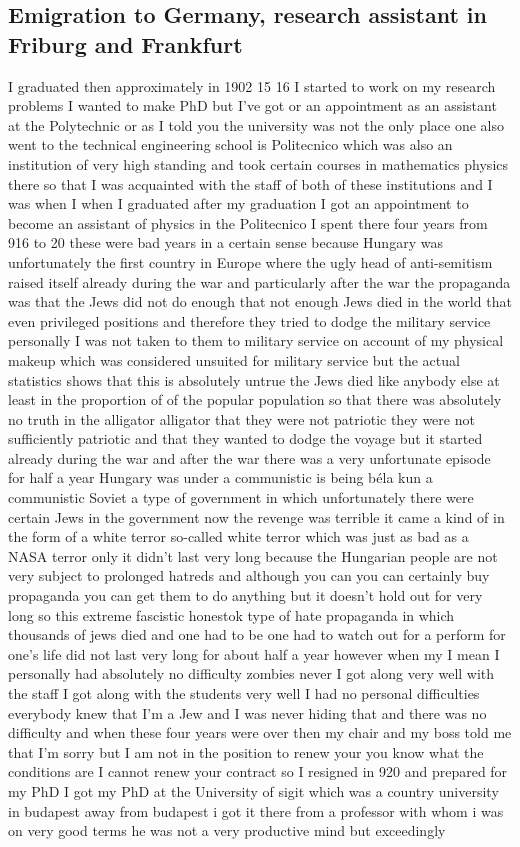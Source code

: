 \documentclass{article}
\begin{document}
\subsection{Emigration to Germany, research assistant in Friburg and Frankfurt}
I graduated then approximately in 1902 15 16 I started to work on my research problems I wanted to make PhD but I've got or an appointment as an assistant at the Polytechnic or as I told you the university was not the only place one also went to the technical engineering school is Politecnico which was also an institution of very high standing and took certain courses in mathematics physics there so that I was acquainted with the staff of both of these institutions and I was when I when I graduated after my graduation I got an appointment to become an assistant of physics in the Politecnico I spent there four years from 916 to 20 these were bad years in a certain sense because Hungary was unfortunately the first country in Europe where the ugly head of anti-semitism raised itself already during the war and particularly after the war the propaganda was that the Jews did not do enough that not enough Jews died in the world that even privileged positions and therefore they tried to dodge the military service personally I was not taken to them to military service on account of my physical makeup which was considered unsuited for military service but the actual statistics shows that this is absolutely untrue the Jews died like anybody else at least in the proportion of of the popular population so that there was absolutely no truth in the alligator alligator that they were not patriotic they were not sufficiently patriotic and that they wanted to dodge the voyage but it started already during the war and after the war there was a very unfortunate episode for half a year Hungary was under a communistic is being béla kun a communistic Soviet a type of government in which unfortunately there were certain Jews in the government now the revenge was terrible it came a kind of in the form of a white terror so-called white terror which was just as bad as a NASA terror only it didn't last very long because the Hungarian people are not very subject to prolonged hatreds and although you can you can certainly buy propaganda you can get them to do anything but it doesn't hold out for very long so this extreme fascistic honestok type of hate propaganda in which thousands of jews died and one had to be one had to watch out for a perform for one's life did not last very long for about half a year however when my I mean I personally had absolutely no difficulty zombies never I got along very well with the staff I got along with the students very well I had no personal difficulties everybody knew that I'm a Jew and I was never hiding that and there was no difficulty and when these four years were over then my chair and my boss told me that I'm sorry but I am not in the position to renew your you know what the conditions are I cannot renew your contract so I resigned in 920 and prepared for my PhD I got my PhD at the University of sigit which was a country university in budapest away from budapest i got it there from a professor with whom i was on very good terms he was not a very productive mind but exceedingly 
\end{document}
